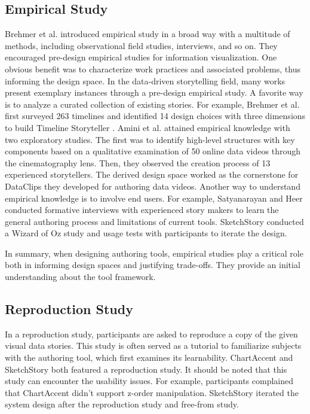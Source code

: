\subsection{Empirical Study}
Brehmer et al. \cite{Brehmer2014} introduced empirical study in a broad way with a multitude of methods, including observational field studies, interviews, and so on. They encouraged pre-design empirical studies for information visualization. One obvious benefit was to characterize work practices and associated problems, thus informing the design space. In the data-driven storytelling field, many works present exemplary instances through a pre-design empirical study. A favorite way is to analyze a curated collection of existing stories. For example, Brehmer et al. first surveyed 263 timelines and identified 14 design choices with three dimensions \cite{Brehmer2017} to build Timeline Storyteller \cite{storyteller}. Amini et al. \cite{Amini2015} attained empirical knowledge with two exploratory studies. The first was to identify high-level structures with key components based on a qualitative examination of 50 online data videos through the cinematography lens. Then, they observed the creation process of 13 experienced storytellers. The derived design space worked as the cornerstone for DataClips \cite{Amini2017} they developed for authoring data videos. Another way to understand empirical knowledge is to involve end users. For example, Satyanarayan and Heer \cite{Satyanarayan2014} conducted formative interviews with experienced story makers to learn the general authoring process and limitations of current tools. SketchStory \cite{Lee2013} conducted a Wizard of Oz study and usage tests with participants \cite{Walny2012} to iterate the design.

In summary, when designing authoring tools, empirical studies play a critical role both in informing design spaces and justifying trade-offs. They provide an initial understanding about the tool framework. 

\subsection{Reproduction Study}
In a reproduction study, participants are asked to reproduce a copy of the given visual data stories. This study is often served as a tutorial to familiarize subjects with the authoring tool, which first examines its learnability. ChartAccent \cite{Ren2017} and SketchStory \cite{Lee2013} both featured a reproduction study. It should be noted that this study can encounter the usability issues. For example, participants complained that ChartAccent \cite{Ren2017} didn’t support z-order manipulation. SketchStory \cite{Lee2013} iterated the system design after the reproduction study and free-from study.

